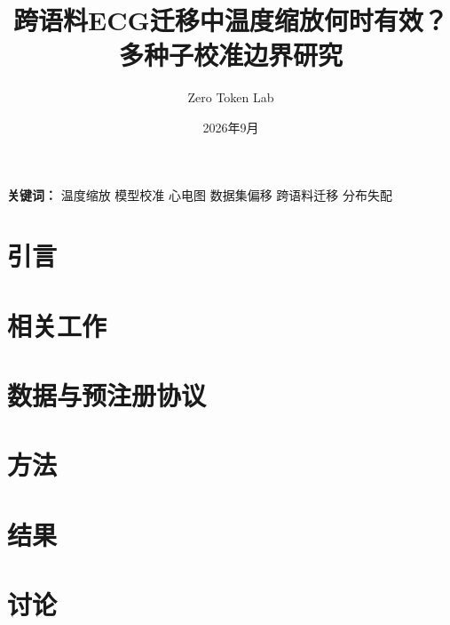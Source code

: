 \documentclass[12pt,a4paper]{ctexart}
\title{\heiti\Large 跨语料ECG迁移中温度缩放何时有效？\\多种子校准边界研究}
\author{Zero Token Lab}
\date{2026年9月}
\begin{document}
\maketitle

\begin{abstract}

\end{abstract}

\noindent\textbf{关键词：} 温度缩放 \quad 模型校准 \quad 心电图 \quad
数据集偏移 \quad 跨语料迁移 \quad 分布失配

\tableofcontents
\newpage

\section{引言}
\label{sec:intro}


\section{相关工作}
\label{sec:related}


\section{数据与预注册协议}
\label{sec:data}


\section{方法}
\label{sec:methods}


\section{结果}
\label{sec:results}


\section{讨论}
\label{sec:discussion}

\end{document}
